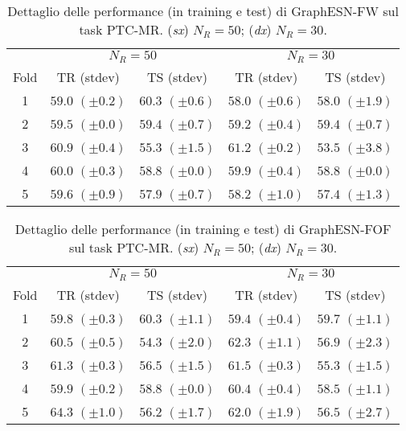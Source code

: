 

\begin{table}[tbph]
\footnotesize
\caption[Dettaglio performance: GraphESN-FW su PTC-MR]{Dettaglio delle performance (in training e test) di GraphESN-FW sul task PTC-MR. (\emph{sx}) $N_R=50$; (\emph{dx}) $N_R=30$.}
\label{app:esp:PTC-MR-FW}
\centering
\begin{tabular}{c*{4}{c}}
\toprule
& \multicolumn{2}{c}{$N_R=50$} & \multicolumn{2}{c}{$N_R=30$}\\
Fold & TR (stdev) & TS (stdev) & TR (stdev) & TS (stdev)\\
\midrule
1 & $59.0$ $(\pm 0.2)$ & $60.3$ $(\pm 0.6)$ & $58.0$ $(\pm 0.6)$ & $58.0$ $(\pm 1.9)$\\
2 & $59.5$ $(\pm 0.0)$ & $59.4$ $(\pm 0.7)$ & $59.2$ $(\pm 0.4)$ & $59.4$ $(\pm 0.7)$\\
3 & $60.9$ $(\pm 0.4)$ & $55.3$ $(\pm 1.5)$ & $61.2$ $(\pm 0.2)$ & $53.5$ $(\pm 3.8)$\\
4 & $60.0$ $(\pm 0.3)$ & $58.8$ $(\pm 0.0)$ & $59.9$ $(\pm 0.4)$ & $58.8$ $(\pm 0.0)$\\
5 & $59.6$ $(\pm 0.9)$ & $57.9$ $(\pm 0.7)$ & $58.2$ $(\pm 1.0)$ & $57.4$ $(\pm 1.3)$\\
\bottomrule
\end{tabular}
\end{table}



\begin{table}[tbph]
\footnotesize
\caption[Dettaglio performance: GraphESN-FOF su PTC-MR]{Dettaglio delle performance (in training e test) di GraphESN-FOF sul task PTC-MR. (\emph{sx}) $N_R=50$; (\emph{dx}) $N_R=30$.}
\label{app:esp:PTC-MR-FOF}
\centering
\begin{tabular}{c*{4}{c}}
\toprule
& \multicolumn{2}{c}{$N_R=50$} & \multicolumn{2}{c}{$N_R=30$}\\
Fold & TR (stdev) & TS (stdev) & TR (stdev) & TS (stdev)\\
\midrule
1 & $59.8$ $(\pm 0.3)$ & $60.3$ $(\pm 1.1)$ & $59.4$ $(\pm 0.4)$ & $59.7$ $(\pm 1.1)$\\
2 & $60.5$ $(\pm 0.5)$ & $54.3$ $(\pm 2.0)$ & $62.3$ $(\pm 1.1)$ & $56.9$ $(\pm 2.3)$\\
3 & $61.3$ $(\pm 0.3)$ & $56.5$ $(\pm 1.5)$ & $61.5$ $(\pm 0.3)$ & $55.3$ $(\pm 1.5)$\\
4 & $59.9$ $(\pm 0.2)$ & $58.8$ $(\pm 0.0)$ & $60.4$ $(\pm 0.4)$ & $58.5$ $(\pm 1.1)$\\
5 & $64.3$ $(\pm 1.0)$ & $56.2$ $(\pm 1.7)$ & $62.0$ $(\pm 1.9)$ & $56.5$ $(\pm 2.7)$\\
\bottomrule
\end{tabular}
\end{table}



